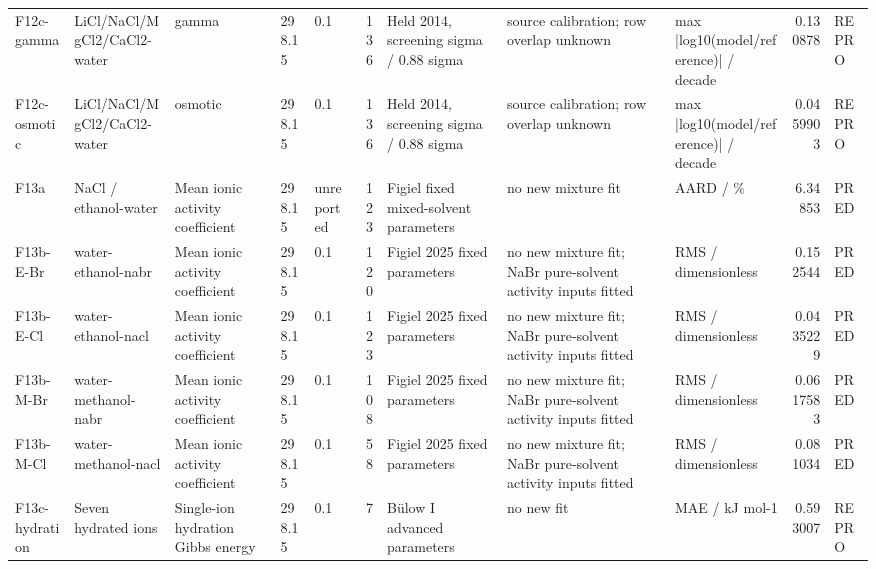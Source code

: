 \begin{landscape}
\begin{longtable}{L{1.9cm}L{2.5cm}L{2.1cm}L{1.6cm}L{1.6cm}rL{2.4cm}L{1.9cm}L{2.2cm}rL{1cm}}
F12c-\allowbreak{}gamma & LiCl/\allowbreak{}NaCl/\allowbreak{}MgCl2/\allowbreak{}CaCl2-\allowbreak{}water & gamma & 298.15 & 0.1 & 136 & Held 2014, screening sigma /\allowbreak{} 0.88 sigma & source calibration; row overlap unknown & max |log10(model/\allowbreak{}reference)| /\allowbreak{} decade & 0.130878 & REPRO \\
F12c-\allowbreak{}osmotic & LiCl/\allowbreak{}NaCl/\allowbreak{}MgCl2/\allowbreak{}CaCl2-\allowbreak{}water & osmotic & 298.15 & 0.1 & 136 & Held 2014, screening sigma /\allowbreak{} 0.88 sigma & source calibration; row overlap unknown & max |log10(model/\allowbreak{}reference)| /\allowbreak{} decade & 0.0459903 & REPRO \\
F13a & NaCl /\allowbreak{} ethanol-\allowbreak{}water & Mean ionic activity coefficient & 298.15 & unreported & 123 & Figiel fixed mixed-\allowbreak{}solvent parameters & no new mixture fit & AARD /\allowbreak{} \% & 6.34853 & PRED \\
F13b-\allowbreak{}E-\allowbreak{}Br & water-\allowbreak{}ethanol-\allowbreak{}nabr & Mean ionic activity coefficient & 298.15 & 0.1 & 120 & Figiel 2025 fixed parameters & no new mixture fit; NaBr pure-\allowbreak{}solvent activity inputs fitted & RMS /\allowbreak{} dimensionless & 0.152544 & PRED \\
F13b-\allowbreak{}E-\allowbreak{}Cl & water-\allowbreak{}ethanol-\allowbreak{}nacl & Mean ionic activity coefficient & 298.15 & 0.1 & 123 & Figiel 2025 fixed parameters & no new mixture fit; NaBr pure-\allowbreak{}solvent activity inputs fitted & RMS /\allowbreak{} dimensionless & 0.0435229 & PRED \\
F13b-\allowbreak{}M-\allowbreak{}Br & water-\allowbreak{}methanol-\allowbreak{}nabr & Mean ionic activity coefficient & 298.15 & 0.1 & 108 & Figiel 2025 fixed parameters & no new mixture fit; NaBr pure-\allowbreak{}solvent activity inputs fitted & RMS /\allowbreak{} dimensionless & 0.0617583 & PRED \\
F13b-\allowbreak{}M-\allowbreak{}Cl & water-\allowbreak{}methanol-\allowbreak{}nacl & Mean ionic activity coefficient & 298.15 & 0.1 & 58 & Figiel 2025 fixed parameters & no new mixture fit; NaBr pure-\allowbreak{}solvent activity inputs fitted & RMS /\allowbreak{} dimensionless & 0.081034 & PRED \\
F13c-\allowbreak{}hydration & Seven hydrated ions & Single-\allowbreak{}ion hydration Gibbs energy & 298.15 & 0.1 & 7 & Bülow I advanced parameters & no new fit & MAE /\allowbreak{} kJ mol-\allowbreak{}1 & 0.593007 & REPRO \\

\end{longtable}
\end{landscape}
